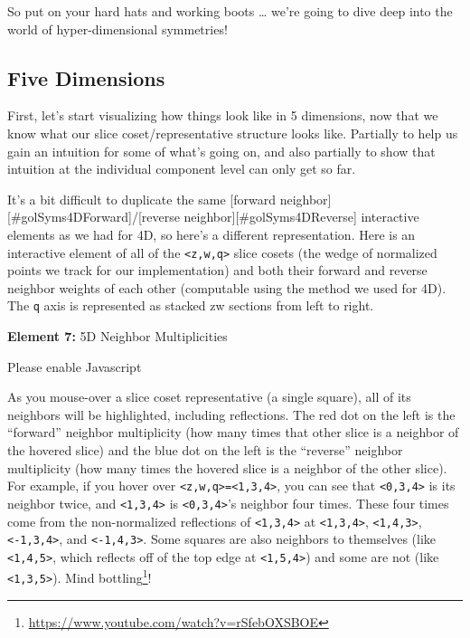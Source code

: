 \documentclass[]{article}
\renewcommand{\href}[2]{#2\footnote{\url{#1}}}
\begin{document}
So put on your hard hats and working boots \ldots{} we're going to dive deep
into the world of hyper-dimensional symmetries!

\hypertarget{five-dimensions}{%
\subsection{Five Dimensions}\label{five-dimensions}}

First, let's start visualizing how things look like in 5 dimensions, now that we
know what our slice coset/representative structure looks like. Partially to help
us gain an intuition for some of what's going on, and also partially to show
that intuition at the individual component level can only get so far.

It's a bit difficult to duplicate the same {[}forward
neighbor{]}{[}\#golSyms4DForward{]}/{[}reverse
neighbor{]}{[}\#golSyms4DReverse{]} interactive elements as we had for 4D, so
here's a different representation. Here is an interactive element of all of the
\texttt{\textless{}z,w,q\textgreater{}} slice cosets (the wedge of normalized
points we track for our implementation) and both their forward and reverse
neighbor weights of each other (computable using the method we used for 4D). The
\texttt{q} axis is represented as stacked zw sections from left to right.

\leavevmode\hypertarget{golSyms5D}{}%
\textbf{Element 7:} 5D Neighbor Multiplicities

\leavevmode\hypertarget{golSyms5DCont}{}%
Please enable Javascript

As you mouse-over a slice coset representative (a single square), all of its
neighbors will be highlighted, including reflections. The red dot on the left is
the ``forward'' neighbor multiplicity (how many times that other slice is a
neighbor of the hovered slice) and the blue dot on the left is the ``reverse''
neighbor multiplicity (how many times the hovered slice is a neighbor of the
other slice). For example, if you hover over
\texttt{\textless{}z,w,q\textgreater{}=\textless{}1,3,4\textgreater{}}, you can
see that \texttt{\textless{}0,3,4\textgreater{}} is its neighbor twice, and
\texttt{\textless{}1,3,4\textgreater{}} is
\texttt{\textless{}0,3,4\textgreater{}}'s neighbor four times. These four times
come from the non-normalized reflections of
\texttt{\textless{}1,3,4\textgreater{}} at
\texttt{\textless{}1,3,4\textgreater{}},
\texttt{\textless{}1,4,3\textgreater{}},
\texttt{\textless{}-1,3,4\textgreater{}}, and
\texttt{\textless{}-1,4,3\textgreater{}}. Some squares are also neighbors to
themselves (like \texttt{\textless{}1,4,5\textgreater{}}, which reflects off of
the top edge at \texttt{\textless{}1,5,4\textgreater{}}) and some are not (like
\texttt{\textless{}1,3,5\textgreater{}}).
\href{https://www.youtube.com/watch?v=rSfebOXSBOE}{Mind bottling}!
\end{document}
